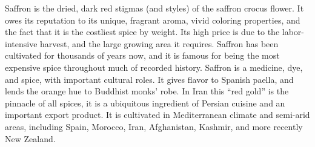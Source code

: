Saffron is the dried, dark red stigmas (and styles) of the saffron crocus flower. It owes its reputation to its unique, fragrant aroma, vivid coloring properties, and the fact that it is the costliest spice by weight. Its high price is due to the labor-intensive harvest, and the large growing area it requires. Saffron has been cultivated for thousands of years now, and it is famous for being the most expensive spice throughout much of recorded history. Saffron is a medicine, dye, and spice, with important cultural roles. It gives flavor to Spanish paella, and lends the orange hue to Buddhist monks' robe. In Iran this ``red gold'' is the pinnacle of all spices, it is a ubiquitous ingredient of Persian cuisine and an important export product. It is cultivated in Mediterranean climate and semi-arid areas, including Spain, Morocco, Iran, Afghanistan, Kashmir, and more recently New Zealand.





